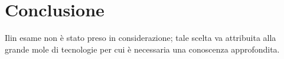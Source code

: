 \section{Conclusione}
Ilin esame non è stato preso in considerazione; tale scelta va attribuita alla grande mole di tecnologie per cui è necessaria una conoscenza approfondita.